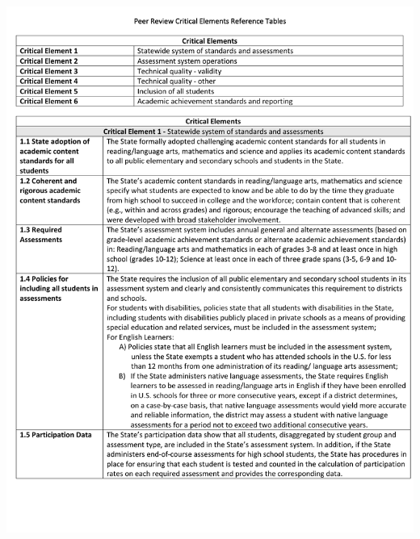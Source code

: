\documentclass[]{book}
\begin{document}
\newpage

\includegraphics{figures/peer_rev/Critical_Elements_Reference_Tables.pdf}

\newpage
\end{document}
